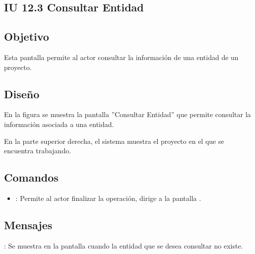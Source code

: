\subsection{IU 12.3 Consultar Entidad}

\subsection{Objetivo}
	Esta pantalla permite al actor consultar la información de una entidad de un proyecto.
\subsection{Diseño}
	En la figura  se muestra la pantalla ''Consultar Entidad'' que permite consultar la información asociada  a una entidad.
	
	En la parte superior derecha, el sistema muestra el proyecto en el que se encuentra trabajando.

\subsection{Comandos}
\begin{itemize}
	\item {}: Permite al actor finalizar la operación, dirige a la pantalla .
\end{itemize}

\subsection{Mensajes}

\begin{Citemize}
	\item {}: Se muestra en la pantalla  cuando la entidad que se desea consultar no existe.
\end{Citemize}
